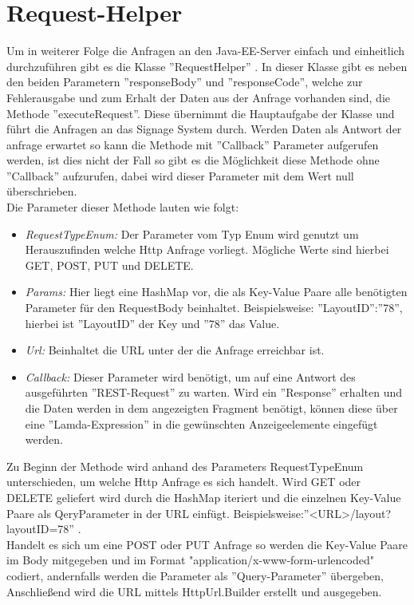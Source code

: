 \section{Request-Helper}
Um in weiterer Folge die Anfragen an den Java-EE-Server einfach und einheitlich durchzuführen gibt es die Klasse ''RequestHelper'' . In dieser Klasse gibt es neben den beiden Parametern ''responseBody'' und ''responseCode'', welche zur Fehlerausgabe und zum Erhalt der Daten aus der Anfrage vorhanden sind, die Methode ''executeRequest''. Diese übernimmt die Hauptaufgabe der Klasse und führt die Anfragen an das Signage System durch. Werden Daten als Antwort der anfrage erwartet so kann die Methode mit ''Callback'' Parameter aufgerufen werden, ist dies nicht der Fall so gibt es die Möglichkeit diese Methode ohne ''Callback'' aufzurufen, dabei wird dieser Parameter mit dem Wert null überschrieben.
\\
Die Parameter dieser Methode lauten wie folgt:
\\
\begin{itemize}
	\item {\em RequestTypeEnum:} Der Parameter vom Typ Enum wird genutzt um Herauszufinden welche Http Anfrage vorliegt. Mögliche Werte sind hierbei GET, POST, PUT und DELETE.
	
	\item {\em Params:} Hier liegt eine HashMap vor, die als Key-Value Paare alle benötigten Parameter für den RequestBody beinhaltet. Beispielsweise: ''LayoutID'':''78'', hierbei ist ''LayoutID'' der Key und ''78'' das Value.
		
	\item {\em Url:} Beinhaltet die URL unter der die Anfrage erreichbar ist. 
	
	\item {\em Callback:} Dieser Parameter wird benötigt, um auf eine Antwort des ausgeführten ''REST-Request'' zu warten. Wird ein ''Response'' erhalten und die Daten werden in dem angezeigten Fragment benötigt, können diese über eine ''Lamda-Expression'' in die gewünschten Anzeigeelemente eingefügt werden. 
\end{itemize}
Zu Beginn der Methode wird anhand des Parameters RequestTypeEnum unterschieden, um welche Http Anfrage es sich handelt. Wird GET oder DELETE geliefert wird durch die HashMap iteriert und die einzelnen Key-Value Paare als QeryParameter in der URL einfügt.
Beispielsweise:''<URL>/layout?layoutID=78'' .
\\
Handelt es sich um eine POST oder PUT Anfrage so werden die Key-Value Paare im Body mitgegeben und im Format "application/x-www-form-urlencoded" codiert, andernfalls werden die Parameter als ''Query-Parameter'' übergeben, Anschließend wird die URL mittels HttpUrl.Builder erstellt und ausgegeben. 
